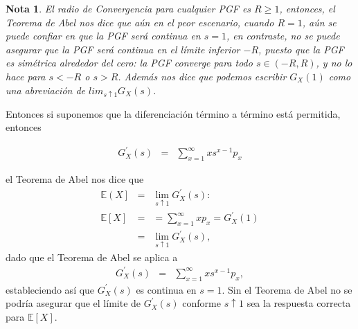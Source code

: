 \documentclass{article}
\newtheorem{Note}{Nota}
\newcommand{\esp}{\mathbb{E}}
\begin{document}
\begin{Note}
El radio de Convergencia para cualquier PGF es $R\geq1$, entonces, el Teorema de Abel nos dice que a\'un en el peor escenario, cuando $R=1$, a\'un se puede confiar en que la PGF ser\'a continua en $s=1$, en contraste, no se puede asegurar que la PGF ser\'a continua en el l\'imite inferior $-R$, puesto que la PGF es sim\'etrica alrededor del cero: la PGF converge para todo $s\in\left(-R,R\right)$, y no lo hace para $s<-R$ o $s>R$. Adem\'as nos dice que podemos escribir $G_{X}\left(1\right)$ como una abreviaci\'on de $lim_{s\uparrow1}G_{X}\left(s\right)$.
\end{Note}

Entonces si suponemos que la diferenciaci\'on t\'ermino a t\'ermino est\'a permitida, entonces

\begin{eqnarray*}
G_{X}^{'}\left(s\right)&=&\sum_{x=1}^{\infty}xs^{x-1}p_{x}
\end{eqnarray*}

el Teorema de Abel nos dice que
\begin{eqnarray*}
\esp\left(X\right]&=&\lim_{s\uparrow1}G_{X}^{'}\left(s\right):\\
\esp\left[X\right]&=&=\sum_{x=1}^{\infty}xp_{x}=G_{X}^{'}\left(1\right)\\
&=&\lim_{s\uparrow1}G_{X}^{'}\left(s\right),
\end{eqnarray*}
dado que el Teorema de Abel se aplica a
\begin{eqnarray*}
G_{X}^{'}\left(s\right)&=&\sum_{x=1}^{\infty}xs^{x-1}p_{x},
\end{eqnarray*}
estableciendo as\'i que $G_{X}^{'}\left(s\right)$ es continua en $s=1$. Sin el Teorema de Abel no se podr\'ia asegurar que el l\'imite de $G_{X}^{'}\left(s\right)$ conforme $s\uparrow1$ sea la respuesta correcta para $\esp\left[X\right]$.
\end{document}
